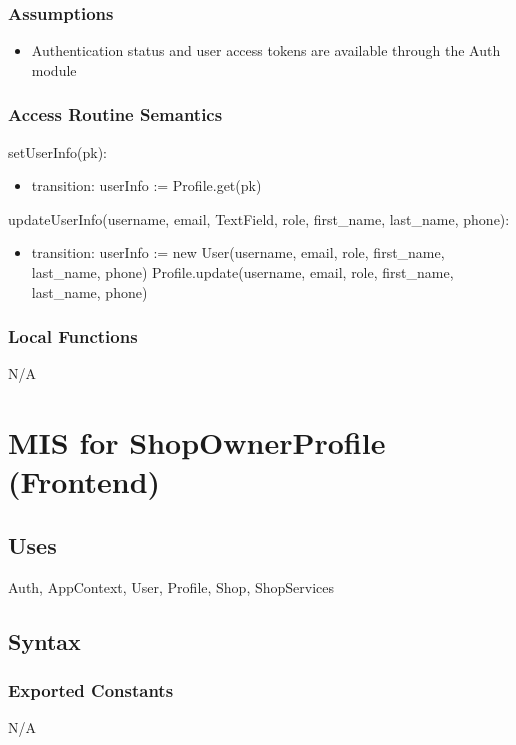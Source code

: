 \documentclass[12pt, titlepage]{article}
\begin{document}
        \subsubsection{Assumptions}
            \begin{itemize}
                \item Authentication status and user access tokens are available through the Auth module
            \end{itemize}
        \subsubsection{Access Routine Semantics}
            \noindent setUserInfo(pk):
            \begin{itemize}
                \item transition: userInfo := Profile.get(pk)
            \end{itemize}
            \noindent updateUserInfo(username, email, TextField, role, first\_name, last\_name, phone):
            \begin{itemize}
                \item transition: userInfo := new User(username, email, role, first\_name, last\_name, phone) \newline Profile.update(username, email, role, first\_name, last\_name, phone)
            \end{itemize}
        \subsubsection{Local Functions}
        N/A

\newpage
\section{MIS for ShopOwnerProfile (Frontend)}
    \subsection{Uses}
        Auth, AppContext, User, Profile, Shop, ShopServices
    \subsection{Syntax}
        \subsubsection{Exported Constants}
            N/A
\end{document}
